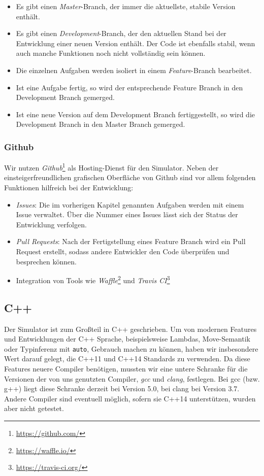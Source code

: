\begin{itemize}
	\item Es gibt einen \emph{Master}-Branch, der immer die aktuellste, stabile Version enthält.
	\item Es gibt einen \emph{Development}-Branch, der den aktuellen Stand bei der Entwicklung
	einer neuen Version enthält. Der Code ist ebenfalls stabil, wenn auch manche Funktionen noch
	nicht vollständig sein können.
	\item Die einzelnen Aufgaben werden isoliert in einem \emph{Feature}-Branch bearbeitet.
	\item Ist eine Aufgabe fertig, so wird der entsprechende Feature Branch in den Development
	Branch gemerged.
	\item Ist eine neue Version auf dem Development Branch fertiggestellt, so wird die Development
	Branch in den Master Branch gemerged.
\end{itemize}

\subsubsection{Github}

Wir nutzen \emph{Github}\footnote{\url{https://github.com/}} als Hosting-Dienst
für den Simulator. Neben der einsteigerfreundlichen grafischen Oberfläche von
Github sind vor allem folgenden Funktionen hilfreich bei der Entwicklung:

\begin{itemize}
  \item \emph{Issues}: Die im vorherigen Kapitel genannten Aufgaben werden mit
  einem Issue verwaltet. Über die Nummer eines Issues lässt sich der Status der
  Entwicklung verfolgen.
  \item \emph{Pull Requests}: Nach der Fertigstellung eines Feature Branch wird
  ein Pull Request erstellt, sodass andere Entwickler den Code überprüfen und
  besprechen können.
	\item Integration von Tools wie
	\emph{Waffle}\footnote{\url{https://waffle.io/}} und \emph{Travis
	CI}\footnote{\url{https://travis-ci.org/}}
\end{itemize}

\subsection{C++}

Der Simulator ist zum Großteil in C++ geschrieben. Um von modernen Features und
Entwicklungen der C++ Sprache, beispielsweise Lambdas, Move-Semantik oder
Typinferenz mit \texttt{auto}, Gebrauch machen zu können, haben wir insbesondere
Wert darauf gelegt, die C++11 und C++14 Standards zu verwenden. Da diese
Features neuere Compiler benötigen, mussten wir eine untere Schranke für die
Versionen der von uns genutzten Compiler, \emph{gcc} und \emph{clang},
festlegen. Bei gcc (bzw. g++) liegt diese Schranke derzeit bei Version 5.0, bei
clang bei Version 3.7. Andere Compiler sind eventuell möglich, sofern sie C++14
unterstützen, wurden aber nicht getestet.

